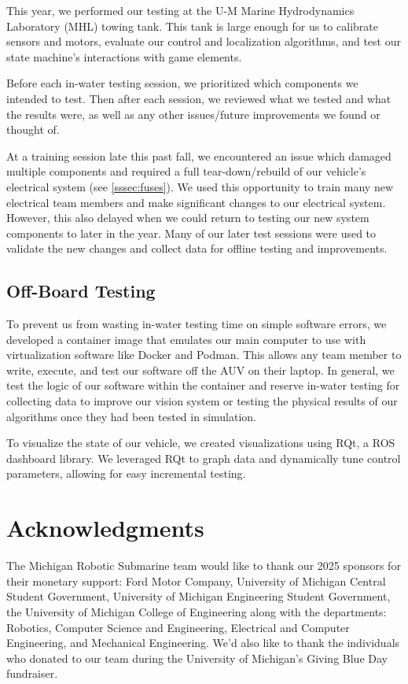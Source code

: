 \documentclass[conference]{IEEEtran}
\begin{document}
This year, we performed our testing at the U-M Marine Hydrodynamics Laboratory (MHL) towing tank. This tank is large enough for us to calibrate sensors and motors, evaluate our control and localization algorithms, and test our state machine's interactions with game elements.

Before each in-water testing session, we prioritized which components we intended to test. Then after each session, we reviewed what we tested and what the results were, as well as any other issues/future improvements we found or thought of. 

At a training session late this past fall, we encountered an issue which damaged multiple components and required a full tear-down/rebuild of our vehicle's electrical system (see \ref{sssec:fuses}). We used this opportunity to train many new electrical team members and make significant changes to our electrical system. However, this also delayed when we could return to testing our new system components to later in the year. Many of our later test sessions were used to validate the new changes and collect data for offline testing and improvements.

\subsection{Off-Board Testing}
\label{ssec:off_board_testing}
To prevent us from wasting in-water testing time on simple software errors, we developed a container image that emulates our main computer to use with virtualization software like Docker and Podman. This allows any team member to write, execute, and test our software off the AUV on their laptop. In general, we test the logic of our software within the container and reserve in-water testing for collecting data to improve our vision system or testing the physical results of our algorithms once they had been tested in simulation. 

To visualize the state of our vehicle, we created visualizations using RQt, a ROS dashboard library. We leveraged RQt to graph data and dynamically tune control parameters, allowing for easy incremental testing.

\section*{Acknowledgments}

The Michigan Robotic Submarine team would like to thank our 2025 sponsors for their monetary support: Ford Motor Company, University of Michigan Central Student Government, University of Michigan Engineering Student Government, the University of Michigan College of Engineering along with the departments: Robotics, Computer Science and Engineering, Electrical and Computer Engineering, and Mechanical Engineering. We'd also like to thank the individuals who donated to our team during the University of Michigan's Giving Blue Day fundraiser.
\end{document}

